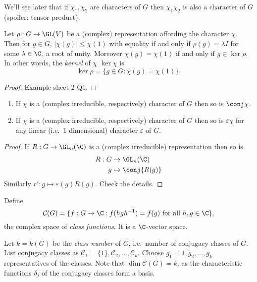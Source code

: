 \documentclass[a4paper]{article}
\begin{document}
\begin{remark}
  We'll see later that if \(\chi_1, \chi_2\) are characters of \(G\) then \(\chi_1\chi_2\) is also a character of \(G\) (spoiler: tensor product).
\end{remark}

\begin{lemma}
  \label{lemma:kernel of character}
  Let \(\rho: G \to \GL(V)\) be a (complex) representation affording the character \(\chi\). Then for \(g \in G\), \(|\chi(g)| \leq \chi(1)\) with equality if and only if \(\rho(g) = \lambda I\) for some \(\lambda \in \C\), a root of unity. Moreover \(\chi(g) = \chi(1)\) if and only if \(g \in \ker \rho\). In other words, the \emph{kernel} of \(\chi\) \(\ker \chi\) is
  \[
    \ker \rho = \{g \in G: \chi(g) = \chi(1)\}.
  \]
\end{lemma}

\begin{proof}
  Example sheet 2 Q1.
\end{proof}

\begin{lemma}\leavevmode
  \begin{enumerate}
  \item If \(\chi\) is a (complex irreducible, respectively) character of \(G\) then so is \(\conj \chi\).
  \item If \(\chi\) is a (complex irreducible, respectively) character of \(G\) then so is \(\varepsilon \chi\) for any linear (i.e.\ \(1\) dimensional) character \(\varepsilon\) of \(G\).
  \end{enumerate}
\end{lemma}

\begin{proof}
  If \(R: G \to \GL_n(\C)\) is a (complex irreducible) representation then so is
  \begin{align*}
    R: G &\to \GL_n(\C) \\
    g &\mapsto \conj{R(g)}
  \end{align*}
  Similarly \(r': g \mapsto \varepsilon(g) R(g)\). Check the details.
\end{proof}

\begin{definition}
  Define
  \[
    \mathcal C(G) = \{f: G \to \C: f(hgh^{-1}) = f(g) \text{ for all } h, g \in \C\},
  \]
  the complex space of \emph{class functions}. It is a \(\C\)-vector space.

  Let \(k = k(G)\) be the \emph{class number} of \(G\), i.e.\ number of conjugacy classes of \(G\). List conjugacy classes as \(\mathcal C_1 = \{1\}, \mathcal C_2, \dots, \mathcal C_k\). Choose \(g_1 = 1, g_2, \dots, g_k\) representatives of the classes. Note that \(\dim \mathcal C(G) = k\), as the characteristic functions \(\delta_j\) of the conjugacy classes form a basis.
\end{definition}
\end{document}
